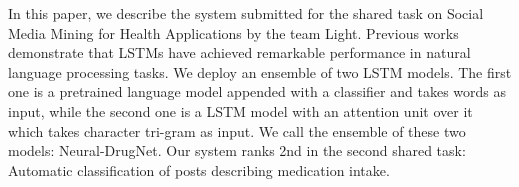 In this paper, we describe the system submitted for the shared task on Social Media Mining for Health Applications by the team Light. Previous works demonstrate that LSTMs have achieved remarkable performance in natural language processing tasks. We deploy an ensemble of two LSTM models. The first one is a pretrained language model appended with a classifier and takes words as input, while the second one is a LSTM model with an attention unit over it which takes character tri-gram as input. We call the ensemble of these two models: Neural-DrugNet. Our system ranks 2nd in the second shared task: Automatic classification of posts describing medication intake.
